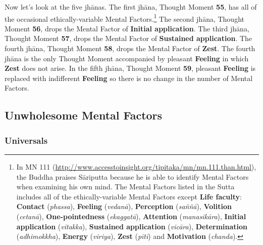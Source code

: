 Now let’s look at the five jhānas. The first jhāna, Thought Moment \textbf{55}, has all of the occasional ethically-variable Mental Factors.\footnote{In MN 111 (\url{http://www.accesstoinsight.org/tipitaka/mn/mn.111.than.html}), the Buddha praises Sāriputta because he is able to identify Mental Factors when examining his own mind. The Mental Factors listed in the Sutta includes all of the ethically-variable Mental Factors except \textbf{Life faculty}: \textbf{Contact} (\textit{phassa}), \textbf{Feeling} (\textit{vedanā}), \textbf{Perception} (\textit{saññā}), \textbf{Volition} (\textit{cetanā}), \textbf{One-pointedness} (\textit{ekaggatā}), \textbf{Attention} (\textit{manasikāra}), \textbf{Initial application} (\textit{vitakka}), \textbf{Sustained application} (\textit{vicāra}), \textbf{Determination} (\textit{adhimokkha}), \textbf{Energy} (\textit{viriya}), \textbf{Zest} (\textit{pīti}) and \textbf{Motivation} (\textit{chanda}).} The second jhāna, Thought Moment \textbf{56}, drops the Mental Factor of \textbf{Initial application}. The third jhāna, Thought Moment \textbf{57}, drops the Mental Factor of \textbf{Sustained application}. The fourth jhāna, Thought Moment \textbf{58}, drops the Mental Factor of \textbf{Zest}. The fourth jhāna is the only Thought Moment accompanied by pleasant \textbf{Feeling} in which \textbf{Zest} does not arise. In the fifth jhāna, Thought Moment \textbf{59}, pleasant \textbf{Feeling} is replaced with indifferent \textbf{Feeling} so there is no change in the number of Mental Factors.

\subsection*{Unwholesome Mental Factors}

\subsubsection*{Universals}

